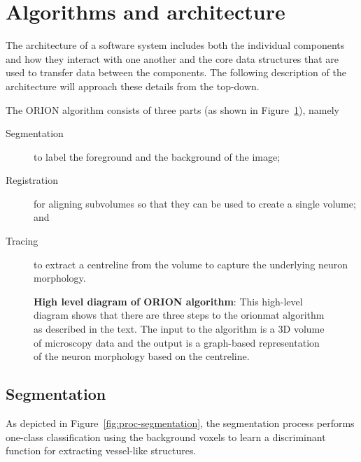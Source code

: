 \section{Algorithms and architecture}

The architecture of a software system includes both the individual
components and how they interact with one another and the core
data structures that are used to transfer data between the
components. The following description of the architecture will
approach these details from the top-down.

The ORION algorithm consists of three parts (as shown in
Figure~\ref{fig:high-level-arch}), namely
\begin{description}
	\item[Segmentation] to label the
		foreground and the background of the image;
	\item[Registration] for aligning subvolumes so
		that they can be used to create a single volume;
		and
	\item[Tracing] to extract a centreline from the volume to
		capture the underlying neuron morphology.
\end{description}

\begin{figure}
\centering
\resizebox{1.0\textwidth}{!}{}
\caption[High level diagram of ORION algorithm]{\textbf{High level
diagram of ORION algorithm}: This high-level diagram shows that
there are three steps to the \gls{orionmat} algorithm as described
in the text. The input to the algorithm is a 3D volume of
microscopy data and the output is a graph-based representation of
the neuron morphology based on the centreline.}\label{fig:high-level-arch}
\end{figure}

\subsection{Segmentation}

As depicted in Figure~\ref{fig:proc-segmentation}, the
segmentation process performs one-class classification using the
background voxels to learn a discriminant function for extracting
vessel-like structures.

